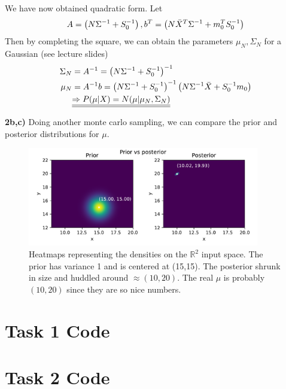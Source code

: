 \documentclass[12pt]{article}
\begin{document}
    We have now obtained quadratic form. Let
    \begin{align}
        A = \left(N\Sigma^{-1}+S_0^{-1}\right), b^T = \left(N\bar{X}^T\Sigma^{-1} + m_0^TS_0^{-1}\right)
    \end{align}
    Then by completing the square, we can obtain the parameters $\mu_N, \Sigma_N$ for a Gaussian (see lecture slides)
    \begin{align}
        \Sigma_N &= A^{-1} = \left(N\Sigma^{-1}+S_0^{-1}\right)^{-1} \\
        \mu_N &= A^{-1}b = \left(N\Sigma^{-1}+S_0^{-1}\right)^{-1} \left(N\Sigma^{-1}\bar{X} + S_0^{-1} m_0\right)\\
        &\underline{\underline{\Rightarrow P(\mu| X) = N(\mu|\mu_N, \Sigma_N)}}
    \end{align}

    \textbf{2b,c)} Doing another monte carlo sampling, we can compare the prior and posterior distributions for $\mu$. 
    \begin{figure}[H]
        \centering
        \includegraphics[width=0.9\textwidth]{2c.pdf}
        \caption{Heatmaps representing the densities on the $\mathbb{R}^2$ input space. The prior has variance 1 and is centered at (15,15). The posterior shrunk in size and huddled around $\approx (10,20)$. The real $\mu$ is probably $(10,20)$ since they are so nice numbers.} 
    \end{figure}

% 
% 
% 

\appendix
\section{Task 1 Code}
\section{Task 2 Code}
\end{document}
